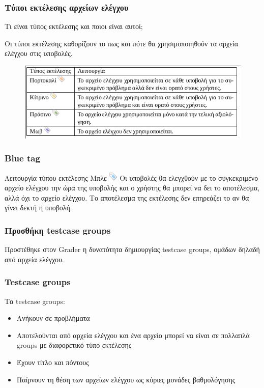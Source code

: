 \documentclass{beamer}
\begin{document}
\begin{frame}
  \frametitle{Τύποι εκτέλεσης αρχείων ελέγχου}
  Τι είναι τύπος εκτέλεσης και ποιοι είναι αυτοί;

  \bigskip

  Οι τύποι εκτέλεσης καθορίζουν το πως και πότε θα χρησιμοποιηθούν τα αρχεία ελέγχου
  στις υποβολές.

  \begin{figure}

    \includegraphics[scale=0.6,trim=4 4 4 4,clip]{../Figures/tipoi.png}
  \end{figure}
\end{frame}

\begin{frame}
  \frametitle{Blue tag}
  \begin{block}{Λειτουργία τύπου εκτέλεσης Μπλε \includegraphics[scale=0.8]{../Figures/tag_blue.png}}
    Οι υποβολές θα ελεγχθούν με το συγκεκριμένο αρχείο ελέγχου την ώρα της υποβολής και ο χρήστης θα μπορεί να δει το αποτέλεσμα, αλλά όχι το αρχείο ελέγχου. Το αποτέλεσμα της εκτέλεσης δεν επηρεάζει το αν θα γίνει δεκτή η υποβολή.
  \end{block}
\end{frame}

\begin{frame}
  \frametitle{Προσθήκη testcase groups}

  Προστέθηκε στον Grader η δυνατότητα δημιουργίας testcase groups, ομάδων
  δηλαδή από αρχεία ελέγχου.

\end{frame}

\begin{frame}
  \frametitle{Testcase groups}

  Τα testcase groups:

  \begin{itemize}
      \item Ανήκουν σε προβλήματα
      \item Αποτελούνται από αρχεία ελέγχου και ένα αρχείο μπορεί να είναι
        σε πολλαπλά groups με διαφορετικό τύπο εκτέλεσης
      \item Έχουν τίτλο και πόντους
      \item Παίρνουν τη θέση των αρχείων ελέγχου ως κύριες μονάδες βαθμολόγησης
  \end{itemize}
\end{frame}
\end{document}
